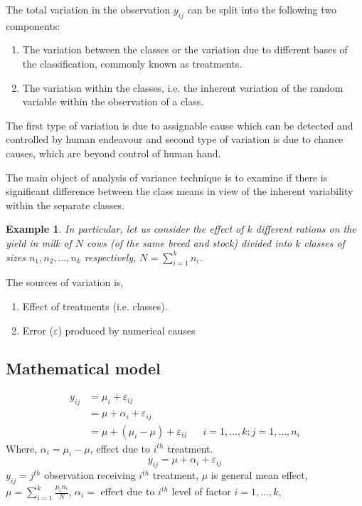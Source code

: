 \documentclass[oneside,11pt,pdftex]{book}%
\numberwithin{equation}{section}
\newtheorem{example}[theorem]{Example}
\numberwithin{section}{chapter}
\numberwithin{equation}{chapter}
\begin{document}
The total variation in the observation $ y_{ij} $ can be split into the following two components: 
\begin{enumerate}
	\item The variation between the classes or the variation due to different bases of the classification, commonly known as treatments.
	\item The variation within the classes, i.e. the inherent variation of the random variable within the observation of a class.
\end{enumerate}
The first type of variation is due to assignable cause which can be detected and controlled by human endeavour and second type of variation is due to chance causes, which are beyond control of human hand.
\par 
The main object of analysis of variance technique is to examine if there is significant difference between the class means in view of the inherent variability within the separate classes.
\par 
\begin{example}
	In particular, let us consider the effect of $ k $ different rations on the yield in milk of $ N $ cows (of the same breed and stock) divided into $ k $ classes of sizes $ n_1, n_2, \dots, n_k $ respectively, $ N=\sum_{i=1}^{k} n_i$.
\end{example}

The sources of variation is,
\begin{enumerate}
	\item Effect of treatments (i.e. classes).
	\item Error ($ \varepsilon $) produced by numerical causes
\end{enumerate}

\subsection{Mathematical model}
\begin{align*}
	y_{ij}&=\mu_i + \varepsilon_{ij} && \\
	&= \mu + \alpha_i + \varepsilon_{ij}&&\\
	&= \mu + (\mu_i - \mu) + \varepsilon_{ij} && i=1,\dots,k; j=1,\dots,n_i
\end{align*}
Where, $ \alpha_i=\mu_i-\mu $, effect due to $ i^{th} $ treatment.
 \[ \boxed{ y_{ij}=\mu + \alpha_i +\varepsilon_{ij}}\]
$ y_{ij}= j^{th} $ observation receiving $i^{th}$ treatment, $ \mu $ is general mean effect, $ \mu=\sum_{i=1}^{k}\frac{\mu_i n_i}{N} $, $ \alpha_i =$ effect due to $ i^{th} $ level of factor $ i=1,\dots,k $, 
 
\end{document}
